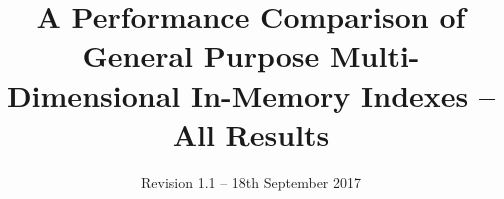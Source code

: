 \documentclass{vldb}
\begin{document}
\title{A Performance Comparison of General Purpose Multi-Dimensional In-Memory Indexes -- All Results}
\subtitle{Revision 1.1 -- 18th September 2017}


%
%
%
%
%

%
\end{document}
